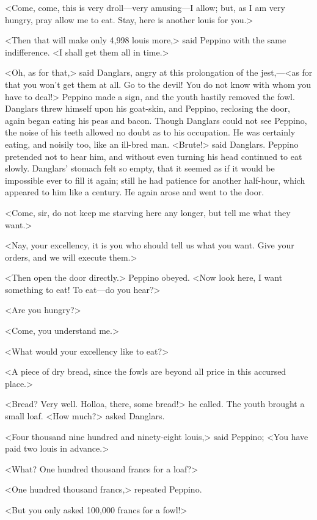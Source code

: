  <Come, come, this is very droll—very amusing—I allow; but, as I am very hungry, pray allow me to eat. Stay, here is another louis for you.> 

 <Then that will make only 4,998 louis more,> said Peppino with the same indifference. <I shall get them all in time.> 

 <Oh, as for that,> said Danglars, angry at this prolongation of the jest,—<as for that you won't get them at all. Go to the devil! You do not know with whom you have to deal!>  Peppino made a sign, and the youth hastily removed the fowl. Danglars threw himself upon his goat-skin, and Peppino, reclosing the door, again began eating his peas and bacon. Though Danglars could not see Peppino, the noise of his teeth allowed no doubt as to his occupation. He was certainly eating, and noisily too, like an ill-bred man. <Brute!> said Danglars. Peppino pretended not to hear him, and without even turning his head continued to eat slowly. Danglars' stomach felt so empty, that it seemed as if it would be impossible ever to fill it again; still he had patience for another half-hour, which appeared to him like a century. He again arose and went to the door. 

 <Come, sir, do not keep me starving here any longer, but tell me what they want.> 

 <Nay, your excellency, it is you who should tell us what you want. Give your orders, and we will execute them.> 

 <Then open the door directly.> Peppino obeyed. <Now look here, I want something to eat! To eat—do you hear?> 

 <Are you hungry?> 

 <Come, you understand me.> 

 <What would your excellency like to eat?> 

 <A piece of dry bread, since the fowls are beyond all price in this accursed place.> 

 <Bread? Very well. Holloa, there, some bread!> he called. The youth brought a small loaf. <How much?> asked Danglars. 

 <Four thousand nine hundred and ninety-eight louis,> said Peppino; <You have paid two louis in advance.>

<What? One hundred thousand francs for a loaf?> 

 <One hundred thousand francs,> repeated Peppino. 

 <But you only asked 100,000 francs for a fowl!> 

